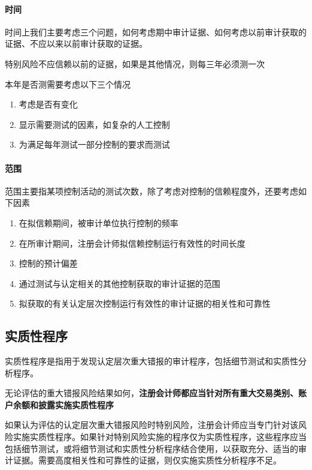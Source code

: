 \documentclass[UTF8,12pt]{ctexart}
\numberwithin{equation}{section} %
\numberwithin{figure}{section}
\numberwithin{table}{section}
\begin{document}
	\paragraph{时间}
	时间上我们主要考虑三个问题，如何考虑期中审计证据、如何考虑以前审计获取的证据、不应以来以前审计获取的证据。
	
	特别风险不应信赖以前的证据，如果是其他情况，则每三年必须测一次
	
	本年是否测需要考虑以下三个情况
	\begin{enumerate}
		\item 考虑是否有变化
		
		\item 显示需要测试的因素，如复杂的人工控制
		
		\item 为满足每年测试一部分控制的要求而测试
	\end{enumerate}
	
	
	
	\paragraph{范围}
	范围主要指某项控制活动的测试次数，除了考虑对控制的信赖程度外，还要考虑如下因素
	\begin{enumerate}
		\item 在拟信赖期间，被审计单位执行控制的频率
		
		\item 在所审计期间，注册会计师拟信赖控制运行有效性的时间长度
		
		\item 控制的预计偏差
		
		\item 通过测试与认定相关的其他控制获取的审计证据的范围
		
		\item 拟获取的有关认定层次控制运行有效性的审计证据的相关性和可靠性
	\end{enumerate}
	
	\subsection{实质性程序}
	实质性程序是指用于发现认定层次重大错报的审计程序，包括细节测试和实质性分析程序。
	
	无论评估的重大错报风险结果如何，\textbf{注册会计师都应当针对所有重大交易类别、账户余额和披露实施实质性程序}
	
	如果认为评估的认定层次重大错报风险时特别风险，注册会计师应当专门针对该风险实施实质性程序。如果针对特别风险实施的程序仅为实质性程序，这些程序应当包括细节测试，或将细节测试和实质性分析程序结合使用，以获取充分、适当的审计证据。需要高度相关性和可靠性的证据，则仅实施实质性分析程序不足。
	
\end{document}
